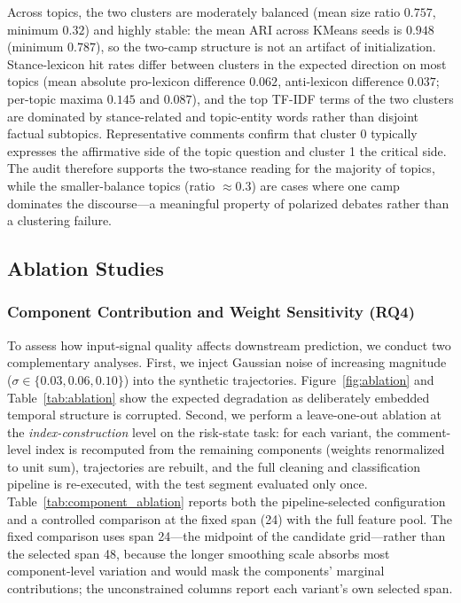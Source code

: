 \documentclass[journal]{IEEEtran}
\begin{document}
Across topics, the two clusters are moderately balanced (mean size ratio $0.757$, minimum $0.32$) and highly stable: the mean ARI across KMeans seeds is $0.948$ (minimum $0.787$), so the two-camp structure is not an artifact of initialization. Stance-lexicon hit rates differ between clusters in the expected direction on most topics (mean absolute pro-lexicon difference $0.062$, anti-lexicon difference $0.037$; per-topic maxima $0.145$ and $0.087$), and the top TF-IDF terms of the two clusters are dominated by stance-related and topic-entity words rather than disjoint factual subtopics. Representative comments confirm that cluster 0 typically expresses the affirmative side of the topic question and cluster 1 the critical side. The audit therefore supports the two-stance reading for the majority of topics, while the smaller-balance topics (ratio $\approx 0.3$) are cases where one camp dominates the discourse---a meaningful property of polarized debates rather than a clustering failure.

\subsection{Ablation Studies}
\label{sec:ablation}

\subsubsection{Component Contribution and Weight Sensitivity (RQ4)}\label{sec:component_ablation}

To assess how input-signal quality affects downstream prediction, we conduct two complementary analyses. First, we inject Gaussian noise of increasing magnitude ($\sigma \in \{0.03, 0.06, 0.10\}$) into the synthetic trajectories. Figure~\ref{fig:ablation} and Table~\ref{tab:ablation} show the expected degradation as deliberately embedded temporal structure is corrupted. Second, we perform a leave-one-out ablation at the \emph{index-construction} level on the risk-state task: for each variant, the comment-level index is recomputed from the remaining components (weights renormalized to unit sum), trajectories are rebuilt, and the full cleaning and classification pipeline is re-executed, with the test segment evaluated only once. Table~\ref{tab:component_ablation} reports both the pipeline-selected configuration and a controlled comparison at the fixed span (24) with the full feature pool. The fixed comparison uses span 24---the midpoint of the candidate grid---rather than the selected span 48, because the longer smoothing scale absorbs most component-level variation and would mask the components' marginal contributions; the unconstrained columns report each variant's own selected span.
\end{document}
